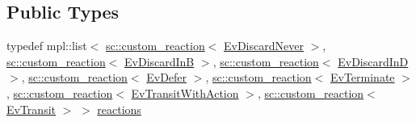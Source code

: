 \subsection*{Public Types}
\begin{DoxyCompactItemize}
\item 
typedef mpl\+::list$<$ \mbox{\hyperlink{classboost_1_1statechart_1_1custom__reaction}{sc\+::custom\+\_\+reaction}}$<$ \mbox{\hyperlink{struct_ev_discard_never}{Ev\+Discard\+Never}} $>$, \mbox{\hyperlink{classboost_1_1statechart_1_1custom__reaction}{sc\+::custom\+\_\+reaction}}$<$ \mbox{\hyperlink{struct_ev_discard_in_b}{Ev\+Discard\+InB}} $>$, \mbox{\hyperlink{classboost_1_1statechart_1_1custom__reaction}{sc\+::custom\+\_\+reaction}}$<$ \mbox{\hyperlink{struct_ev_discard_in_d}{Ev\+Discard\+InD}} $>$, \mbox{\hyperlink{classboost_1_1statechart_1_1custom__reaction}{sc\+::custom\+\_\+reaction}}$<$ \mbox{\hyperlink{struct_ev_defer}{Ev\+Defer}} $>$, \mbox{\hyperlink{classboost_1_1statechart_1_1custom__reaction}{sc\+::custom\+\_\+reaction}}$<$ \mbox{\hyperlink{struct_ev_terminate}{Ev\+Terminate}} $>$, \mbox{\hyperlink{classboost_1_1statechart_1_1custom__reaction}{sc\+::custom\+\_\+reaction}}$<$ \mbox{\hyperlink{struct_ev_transit_with_action}{Ev\+Transit\+With\+Action}} $>$, \mbox{\hyperlink{classboost_1_1statechart_1_1custom__reaction}{sc\+::custom\+\_\+reaction}}$<$ \mbox{\hyperlink{struct_ev_transit}{Ev\+Transit}} $>$ $>$ \mbox{\hyperlink{struct_a_aaf7ef039e669b21e19f81777afeed659}{reactions}}
\item 

\end{DoxyCompactItemize}

